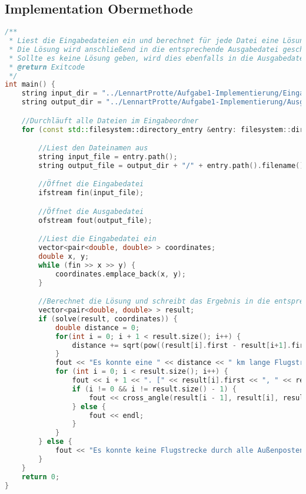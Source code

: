 \documentclass[a4paper,10pt,ngerman]{scrartcl}
\begin{document}
    \subsection{Implementation Obermethode}\label{subsec:implementation-obermethode}
    \begin{lstlisting}[frame=single,language=C++,title=Methode main,breaklines=true,label={lst:code_main}]
/**
 * Liest die Eingabedateien ein und berechnet für jede Datei eine Lösung entsprechend der Aufgabenstellung.
 * Die Lösung wird anschließend in die entsprechende Ausgabedatei geschrieben.
 * Sollte es keine Lösung geben, wird dies ebenfalls in die Ausgabedatei geschrieben.
 * @return Exitcode
 */
int main() {
    string input_dir = "../LennartProtte/Aufgabe1-Implementierung/Eingabedateien";
    string output_dir = "../LennartProtte/Aufgabe1-Implementierung/Ausgabedateien";

    //Durchläuft alle Dateien im Eingabeordner
    for (const std::filesystem::directory_entry &entry: filesystem::directory_iterator(input_dir)) {

        //Liest den Dateinamen aus
        string input_file = entry.path();
        string output_file = output_dir + "/" + entry.path().filename().string();

        //Öffnet die Eingabedatei
        ifstream fin(input_file);

        //Öffnet die Ausgabedatei
        ofstream fout(output_file);

        //Liest die Eingabedatei ein
        vector<pair<double, double> > coordinates;
        double x, y;
        while (fin >> x >> y) {
            coordinates.emplace_back(x, y);
        }

        //Berechnet die Lösung und schreibt das Ergebnis in die entsprechende Ausgabedatei
        vector<pair<double, double> > result;
        if (solve(result, coordinates)) {
            double distance = 0;
            for(int i = 0; i + 1 < result.size(); i++) {
                distance += sqrt(pow((result[i].first - result[i+1].first), 2.0) + (pow((result[i].second - result[i+1].second), 2.0)));
            }
            fout << "Es konnte eine " << distance << " km lange Flugstrecke durch alle Außenposten ermittelt werden." << endl;
            for (int i = 0; i < result.size(); i++) {
                fout << i + 1 << ". [" << result[i].first << ", " << result[i].second << "] ";
                if (i != 0 && i != result.size() - 1) {
                    fout << cross_angle(result[i - 1], result[i], result[i + 1]) << "° " << endl;
                } else {
                    fout << endl;
                }
            }
        } else {
            fout << "Es konnte keine Flugstrecke durch alle Außenposten ermittelt werden." << endl;
        }
    }
    return 0;
}
    \end{lstlisting}
\end{document}
